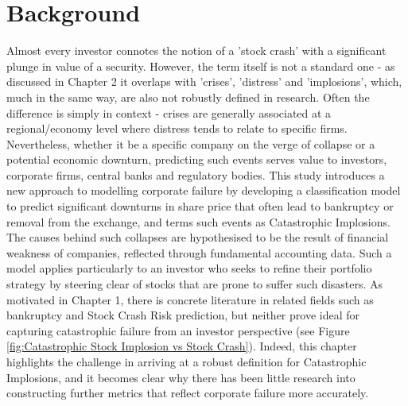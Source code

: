 \documentclass[a4paper]{report}
\begin{document}
\section{Background}
Almost every investor connotes the notion of a 'stock crash' with a significant plunge in value of a security. However, the term itself is not a standard one - as discussed in Chapter 2 it
overlaps with 'crises', 'distress' and 'implosions', which, much in the same way, are also not robustly defined in research. Often the difference is simply in context - crises are generally
associated at a regional/economy level where distress tends to relate to specific firms. Nevertheless, whether it be a specific company on the verge of collapse or a potential economic downturn, 
predicting such events serves value to investors, corporate firms, central banks and regulatory bodies. This study introduces a new approach to modelling corporate failure by developing a classification model 
to predict significant downturns in share price that often lead to bankruptcy or removal from the exchange, and terms such events as Catastrophic Implosions. The causes behind such collapses are hypothesised
to be the result of financial weakness of companies, reflected through fundamental accounting data. Such a model 
applies particularly to an investor who seeks to refine their portfolio strategy by steering clear of stocks that are prone to suffer such disasters. As motivated in Chapter 1, there is concrete literature 
in related fields such as bankruptcy and Stock Crash Risk prediction, but neither prove ideal for capturing catastrophic failure from an investor perspective (see Figure \ref{fig:Catastrophic Stock Implosion vs Stock Crash}). Indeed, 
this chapter highlights the challenge in arriving at a robust definition for Catastrophic Implosions, and it becomes clear why there has been little research into constructing further metrics that reflect corporate failure more accurately.
\end{document}
